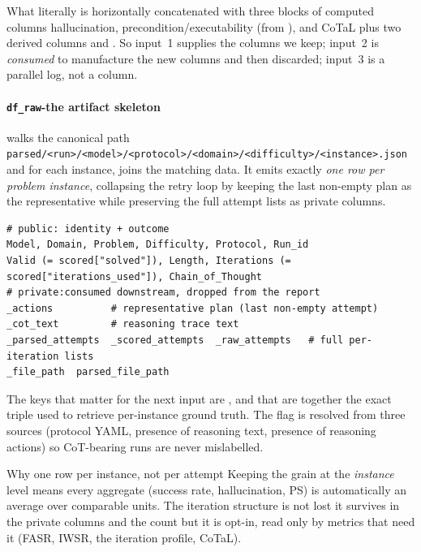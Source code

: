 \begin{bmkeybox}{What  literally is}
 horizontally concatenated with three blocks of
computed columns hallucination, precondition/executability (from
), and CoTaL plus two derived columns  and
. So input~1 supplies the columns we keep; input~2 is
\emph{consumed} to manufacture the new columns and then discarded; input~3 is a
parallel log, not a column.
\end{bmkeybox}

\paragraph{\texorpdfstring{\texttt{df\_raw}}{df\_raw}-the artifact skeleton}

 walks the canonical path
\texttt{parsed/\allowbreak<run>/\allowbreak<model>/\allowbreak<protocol>/\allowbreak<domain>/\allowbreak<difficulty>/\allowbreak<instance>.json} and for each instance, joins the matching  data. 
It emits exactly \emph{one row per problem instance}, collapsing the retry loop by keeping the
last non-empty plan as the representative  while preserving the full attempt lists as private columns.

\begin{lstlisting}
# public: identity + outcome
Model, Domain, Problem, Difficulty, Protocol, Run_id
Valid (= scored["solved"]), Length, Iterations (= scored["iterations_used"]), Chain_of_Thought
# private:consumed downstream, dropped from the report
_actions          # representative plan (last non-empty attempt)
_cot_text         # reasoning trace text
_parsed_attempts  _scored_attempts  _raw_attempts   # full per-iteration lists
_file_path  parsed_file_path
\end{lstlisting}

The keys that matter for the next input are ,  and
 that are together the exact triple used to retrieve per-instance ground
truth. The  flag is resolved from three sources (protocol
YAML, presence of reasoning text, presence of reasoning actions) so CoT-bearing
runs are never mislabelled.

\begin{bmkeybox}{Why one row per instance, not per attempt}
Keeping the grain at the \emph{instance} level means every aggregate (success
rate, hallucination, PS) is automatically an average over comparable units. The
iteration structure is not lost it survives in the private
 columns and the  count but it is opt-in,
read only by metrics that need it (FASR, IWSR, the iteration profile, CoTaL).
\end{bmkeybox}

